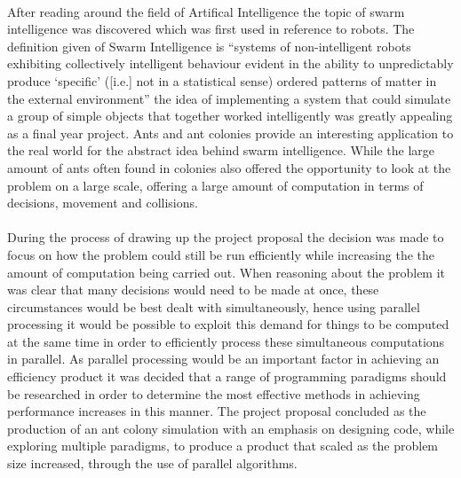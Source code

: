 \documentclass[main.tex]{subfiles}
\begin{document}
\paragraph{}After reading around the field of Artifical Intelligence the topic of swarm intelligence was discovered which was first used in reference to robots. The definition given of Swarm Intelligence is ``systems of non-intelligent robots exhibiting collectively intelligent behaviour evident in the ability to unpredictably produce `specific' ([i.e.] not in a statistical sense) ordered patterns of matter in the external environment''\cite{Beni1989} the idea of implementing a system that could simulate a group of simple objects that together worked intelligently was greatly appealing as a final year project. Ants and ant colonies provide an interesting application to the real world for the abstract idea behind swarm intelligence. While the large amount of ants often found in colonies also offered the opportunity to look at the problem on a large scale, offering a large amount of computation in terms of decisions, movement and collisions.

\paragraph{}During the process of drawing up the project proposal the decision was made to focus on how the problem could still be run efficiently while increasing the the amount of computation being carried out. When reasoning about the problem it was clear that many decisions would need to be made at once, these circumstances would be best dealt with simultaneously, hence using parallel processing it would be possible to exploit this demand for things to be computed at the same time in order to efficiently process these simultaneous computations in parallel. As parallel processing would be an important factor in achieving an efficiency product it was decided that a range of programming paradigms should be researched in order to determine the most effective methods in achieving performance increases in this manner. The project proposal concluded as the production of an ant colony simulation with an emphasis on designing code, while exploring multiple paradigms, to produce a product that scaled as the problem size increased, through the use of parallel algorithms.

\end{document}
